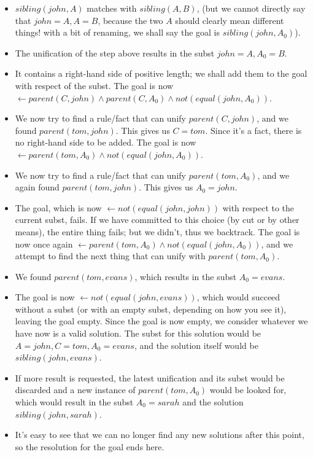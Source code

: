 \begin{itemize}
	\item \(sibling(john, A)\) matches with \(sibling(A,B)\), (but we cannot directly say that \(john = A, A = B\), because the two \(A\) should clearly mean different things! with a bit of renaming, we shall say the goal is \(sibling(john, A_0)\)).
	\item The unification of the step above results in the subst \(john = A, A_0 = B\).
	\item It contains a right-hand side of positive length; we shall add them to the goal with respect of the subst. The goal is now \(\leftarrow parent(C, john) \wedge parent(C, A_0) \wedge not(equal(john, A_0))\).
	\item We now try to find a rule/fact that can unify \(parent(C, john)\), and we found \(parent(tom,john)\). This gives us \(C=tom\). Since it's a fact, there is no right-hand side to be added. The goal is now \(\leftarrow parent(tom, A_0) \wedge not(equal(john, A_0))\).
	\item We now try to find a rule/fact that can unify \(parent(tom, A_0)\), and we again found \(parent(tom,john)\). This gives us \(A_0 = john\).
	\item The goal, which is now \(\leftarrow not(equal(john, john))\) with respect to the current subst, fails. If we have committed to this choice (by cut or by other means), the entire thing fails; but we didn't, thus we backtrack. The goal is now once again \(\leftarrow parent(tom, A_0) \wedge not(equal(john, A_0))\), and we attempt to find the next thing that can unify with \(parent(tom, A_0)\).
	\item We found \(parent(tom, evans)\), which results in the subst \(A_0 = evans\).
	\item The goal is now \(\leftarrow not(equal(john, evans))\), which would succeed without a subst (or with an empty subst, depending on how you see it), leaving the goal empty. Since the goal is now empty, we consider whatever we have now is a valid solution. The subst for this solution would be \(A=john, C=tom, A_0 = evans\), and the solution itself would be \(sibling(john, evans)\).
	\item If more result is requested, the latest unification and its subst would be discarded and a new instance of \(parent(tom, A_0)\) would be looked for, which would result in the subst \(A_0 = sarah\) and the solution \(sibling(john, sarah)\).
	\item It's easy to see that we can no longer find any new solutions after this point, so the resolution for the goal ends here.
\end{itemize}
